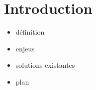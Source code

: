 \section{Introduction}
\label{sec:introduction}
  \begin{itemize}
    \item{définition}
    \item{enjeus}
    \item{solutions existantes}
    \item{plan}
  \end{itemize}




